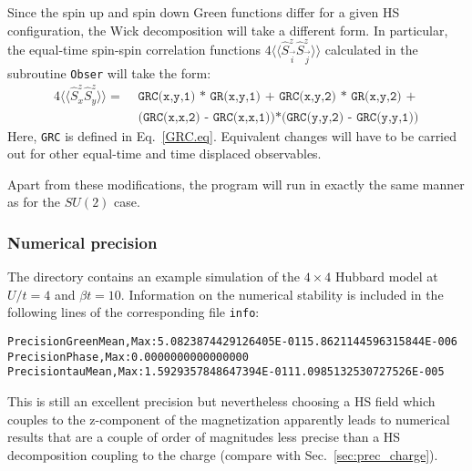  Since  the spin up and spin down Green functions differ  for a given HS configuration,  the Wick decomposition will take a different form. In particular, the  equal-time spin-spin correlation functions 
 $ 4 \langle \langle \hat{S}^{z}_{\vec{i}}   \hat{S}^{z}_{\vec{j}} \rangle \rangle   $  calculated in the subroutine  \texttt{Obser}  will take the form: 
  \begin{align}
   4 \langle \langle \hat{S}^{z}_{x}   \hat{S}^{z}_{y} \rangle \rangle   =   &  \texttt{  GRC(x,y,1) * GR(x,y,1) + GRC(x,y,2) * GR(x,y,2) + }  \nonumber \\ 
 & \texttt{   (GRC(x,x,2) - GRC(x,x,1))*(GRC(y,y,2) - GRC(y,y,1))}  \nonumber
  \end{align}
Here,  \texttt{GRC}  is defined in Eq.~\ref{GRC.eq}.  Equivalent changes will have to be carried out for other equal-time and time displaced observables. 
  
Apart from these modifications, the program  will run in exactly the same manner as for the $SU(2)$ case. 
    
  
\subsubsection{Numerical precision}\label{sec:prec_spin}
The directory   contains an example simulation of the $4 \times 4$ Hubbard model at $U/t=4$ and $\beta t = 10$. 
Information on the numerical stability is included in the following lines of the corresponding file \texttt{info}:
 \begin{alltt}
Precision Green  Mean, Max :    5.0823874429126405E-011   5.8621144596315844E-006
Precision Phase, Max       :    0.0000000000000000     
Precision tau    Mean, Max :    1.5929357848647394E-011   1.0985132530727526E-005 
\end{alltt}

This is still an excellent precision but nevertheless choosing a 
 HS field which couples to the z-component of the magnetization apparently leads to numerical results that are 
a couple of order of magnitudes less precise than a HS decomposition coupling to the charge (compare with Sec.~\ref{sec:prec_charge}).

    
